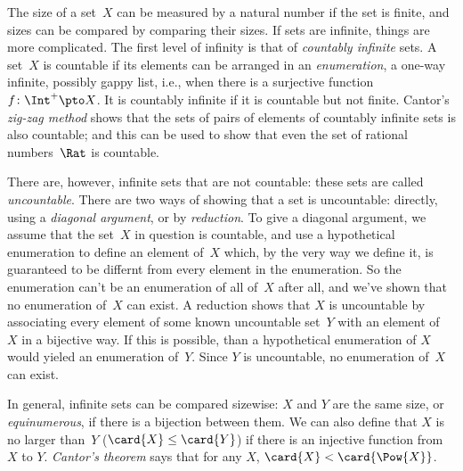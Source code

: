 The size of a set~$X$ can be measured by a natural number if the set
is finite, and sizes can be compared by comparing their sizes. If sets
are infinite, things are more complicated.  The first level of
infinity is that of \emph{countably infinite} sets. A set~$X$ is
countable if its elements can be arranged in an \emph{enumeration}, a
one-way infinite, possibly gappy list, i.e., when there is a
surjective function~$f\colon \Int^+ \pto X$. It is countably infinite
if it is countable but not finite. Cantor's \emph{zig-zag method}
shows that the sets of pairs of elements of countably infinite sets is
also countable; and this can be used to show that even the set of
rational numbers~$\Rat$ is countable.

There are, however, infinite sets that are not countable: these sets
are called \emph{uncountable}. There are two ways of showing that a
set is uncountable: directly, using a \emph{diagonal argument}, or by
\emph{reduction}. To give a diagonal argument, we assume that the
set~$X$ in question is countable, and use a hypothetical enumeration
to define an element of~$X$ which, by the very way we define it, is
guaranteed to be differnt from every element in the enumeration. So
the enumeration can't be an enumeration of all of~$X$ after all, and
we've shown that no enumeration of~$X$ can exist.  A reduction shows
that $X$ is uncountable by associating every element of some known
uncountable set~$Y$ with an element of~$X$ in a bijective way. If this
is possible, than a hypothetical enumeration of $X$ would yieled an
enumeration of~$Y$. Since $Y$ is uncountable, no enumeration of~$X$
can exist.

In general, infinite sets can be compared sizewise: $X$ and $Y$ are
the same size, or \emph{equinumerous}, if there is a bijection between
them. We can also define that $X$ is no larger than~$Y$ ($\card{X} \le
\card{Y}$) if there is an injective function from $X$ to
$Y$. \emph{Cantor's theorem} says that for any $X$, $\card{X} <
\card{\Pow{X}}$.
